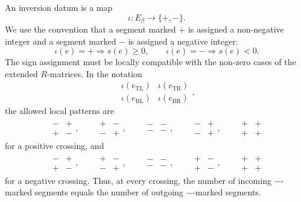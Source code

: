 \documentclass[twocolumn]{article}
\begin{document}
An inversion datum is a map
\[
  \iota:E_\beta\longrightarrow \{+,-\}.
\]
We use the convention that a segment marked \(+\) is assigned a non-negative
integer and a segment marked \(-\) is assigned a negative integer:
\[
  \iota(e)=+ \Longrightarrow s(e)\geq 0,
  \qquad
  \iota(e)=- \Longrightarrow s(e)<0.
\]
The sign assignment must be locally compatible with the non-zero cases of the
extended \(R\)-matrices.  In the notation
\[
  \begin{matrix}
  \iota(e_{\mathrm{TL}}) & \iota(e_{\mathrm{TR}})\\
  \iota(e_{\mathrm{BL}}) & \iota(e_{\mathrm{BR}})
  \end{matrix},
\]
the allowed local patterns are
\begin{equation}\label{eq:positive-inversion-patterns}
\begin{gathered}
\begin{matrix}-&+\\ +&-\end{matrix},\qquad
\begin{matrix}+&-\\ -&+\end{matrix},\qquad
\begin{matrix}-&-\\ -&-\end{matrix},\qquad
\begin{matrix}-&+\\ -&+\end{matrix},\qquad
\begin{matrix}+&+\\ +&+\end{matrix}
\end{gathered}
\end{equation}
for a positive crossing, and
\begin{equation}\label{eq:negative-inversion-patterns}
\begin{gathered}
\begin{matrix}-&+\\ +&-\end{matrix},\qquad
\begin{matrix}+&-\\ -&+\end{matrix},\qquad
\begin{matrix}-&-\\ -&-\end{matrix},\qquad
\begin{matrix}+&-\\ +&-\end{matrix},\qquad
\begin{matrix}+&+\\ +&+\end{matrix}
\end{gathered}
\end{equation}
for a negative crossing.  Thus, at every crossing, the number of incoming
\(-\)-marked segments equals the number of outgoing \(-\)-marked segments.
\end{document}
